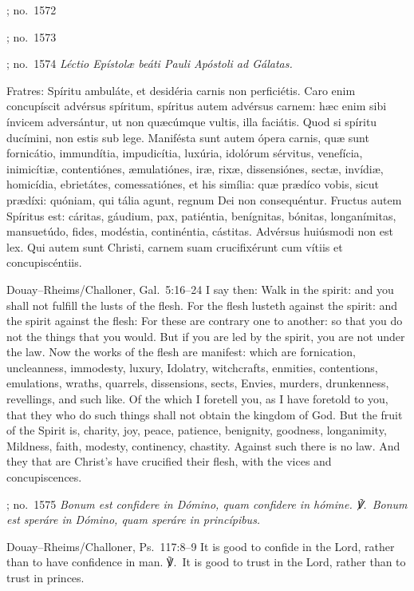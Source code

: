 \begin{massbox}{; no.~1572}
\begin{massbox}{; no.~1573}
\label{epistle}
\begin{massbox}{; no.~1574}\itshape
Léctio Epístolæ beáti Pauli Apóstoli ad Gálatas.

Fratres: Spíritu ambuláte, et desidéria carnis non perficiétis. Caro enim
concupíscit advérsus spíritum, spíritus autem advérsus carnem: hæc enim sibi
ínvicem adversántur, ut non quæcúmque vultis, illa faciátis. Quod si spíritu
ducímini, non estis sub lege. Manifésta sunt autem ópera carnis, quæ sunt
fornicátio, immundítia, impudicítia, luxúria, idolórum sérvitus, venefícia,
inimicítiæ, contentiónes, æmulatiónes, iræ, rixæ, dissensiónes, sectæ,
invídiæ, homicídia, ebrietátes, comessatiónes, et his simília: quæ prædíco
vobis, sicut prædíxi: quóniam, qui tália agunt, regnum Dei non
consequéntur. Fructus autem Spíritus est: cáritas, gáudium, pax, patiéntia,
benígnitas, bónitas, longanímitas, mansuetúdo, fides, modéstia, continéntia,
cástitas. Advérsus huiúsmodi non est lex. Qui autem sunt Christi, carnem
suam crucifixérunt cum vítiis et concupiscéntiis.
\finishfulltextelement
\begin{fulltextenglish}{Douay--Rheims/Challoner, Gal.~5:16--24}
I say then: Walk in the spirit: and you shall not fulfill the lusts of the
flesh. For the flesh lusteth against the spirit: and the spirit against the
flesh: For these are contrary one to another: so that you do not the things
that you would. But if you are led by the spirit, you are not under the law.
Now the works of the flesh are manifest: which are fornication, uncleanness,
immodesty, luxury, Idolatry, witchcrafts, enmities, contentions, emulations,
wraths, quarrels, dissensions, sects, Envies, murders, drunkenness,
revellings, and such like. Of the which I foretell you, as I have foretold to
you, that they who do such things shall not obtain the kingdom of God. But the
fruit of the Spirit is, charity, joy, peace, patience, benignity, goodness,
longanimity, Mildness, faith, modesty, continency, chastity. Against such there
is no law. And they that are Christ's have crucified their flesh, with the
vices and concupiscences.
\end{fulltextenglish}

\label{gradual}
\begin{massbox}{; no.~1575}\itshape
Bonum est confidere in Dómino, quam confidere in hómine. ℣.~Bonum est speráre
in Dómino, quam speráre in princípibus.
\finishfulltextelement
\begin{fulltextenglish}{Douay--Rheims/Challoner, Ps.~117:8--9}
It is good to confide in the Lord, rather than to have confidence in man.
℣.~It is good to trust in the Lord, rather than to trust in princes.
\end{fulltextenglish}


\end{massbox}
\end{massbox}
\end{massbox}
\end{massbox}
